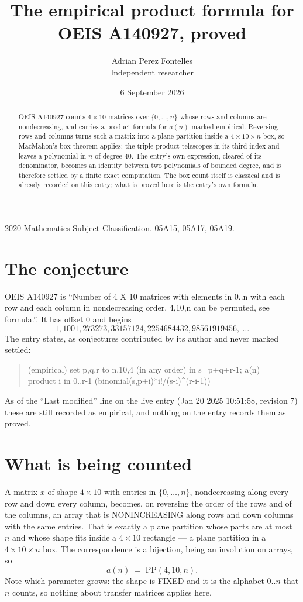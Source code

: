 \documentclass[11pt,a4paper]{article}
\title{The empirical product formula for OEIS A140927, proved}
\author{Adrian Perez Fontelles\\ \small Independent researcher}
\date{6 September 2026}
\theoremstyle{plain}
\theoremstyle{definition}
\begin{document}
\maketitle

\begin{abstract}
OEIS A140927 counts $4\times10$ matrices over $\{0,\dots,n\}$ whose rows and columns are
nondecreasing, and carries a product formula for $a(n)$ marked empirical. Reversing rows and
columns turns such a matrix into a plane partition inside a $4\times10\times n$ box, so
MacMahon's box theorem applies; the triple product telescopes in its third index and leaves a
polynomial in $n$ of degree $40$. The entry's own expression, cleared of its denominator,
becomes an identity between two polynomials of bounded degree, and is therefore settled by a
finite exact computation. The box count itself is classical and is already recorded on this
entry; what is proved here is the entry's own formula.
\end{abstract}

\noindent\small 2020 Mathematics Subject Classification. 05A15, 05A17, 05A19.\normalsize

\section{The conjecture}

OEIS A140927 is ``Number of 4 X 10 matrices with elements in 0..n with each row and each column in nondecreasing order. 4,10,n can be permuted, see formula.''. It has offset $0$ and begins
\[
1, 1001, 273273, 33157124, 2254684432, 98561919456,\ \dots
\]
The entry states, as conjectures contributed by its author and never marked settled:
\begin{quote}
(empirical) set p,q,r to n,10,4 (in any order) in s=p+q+r-1; a(n) = product {i in 0..r-1} (binomial(s,p+i)*i!/(s-i)\^{}(r-i-1))

\end{quote}
As of the ``Last modified'' line on the live entry (Jan 20 2025 10:51:58, revision 7) these are still
recorded as empirical, and nothing on the entry records them as proved.

\section{What is being counted}

A matrix $x$ of shape $4\times10$ with entries in $\{0,\dots,n\}$, nondecreasing along
every row and down every column, becomes, on reversing the order of the rows and of the
columns, an array that is NONINCREASING along rows and down columns with the same entries. That
is exactly a plane partition whose parts are at most $n$ and whose shape fits inside a
$4\times10$ rectangle --- a plane partition in a $4\times10\times n$ box. The
correspondence is a bijection, being an involution on arrays, so
\[
a(n)\;=\;\mathrm{PP}(4,10,n).
\]
Note which parameter grows: the shape is FIXED and it is the alphabet $0..n$ that $n$ counts,
so nothing about transfer matrices applies here.
\end{document}
